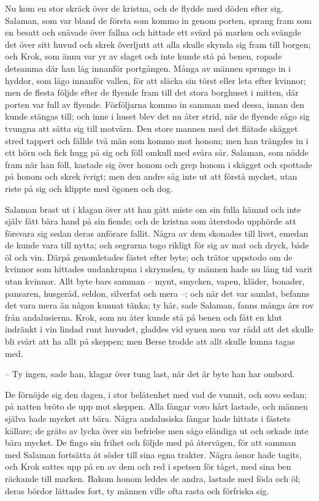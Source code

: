 \initial Nu kom en stor skräck över de kristna, och de flydde med döden efter sig. Salaman, som var bland de första som kommo in genom porten, sprang fram som en besatt och snävade över fallna och hittade ett svärd på marken och svängde det över sitt huvud och skrek överljutt att alla skulle skynda sig fram till borgen; och Krok, som ännu var yr av slaget och inte kunde stå på benen, ropade detsamma där han låg innanför portgången. Många av männen sprungo in i hyddor, som lågo innanför vallen, för att släcka sin törst eller leta efter kvinnor; men de flesta följde efter de flyende fram till det stora borghuset i mitten, där porten var full av flyende. Förföljarna kommo in samman med dessa, innan den kunde stängas till; och inne i huset blev det nu åter strid, när de flyende sågo sig tvungna att sätta sig till motvärn. Den store mannen med det flätade skägget stred tappert och fällde två män som kommo mot honom; men han trängdes in i ett hörn och fick hugg på sig och föll omkull med svåra sår. Salaman, som nådde fram när han föll, kastade sig över honom och grep honom i skägget och spottade på honom och skrek ivrigt; men den andre såg inte ut att förstå mycket, utan riste på sig och klippte med ögonen och dog.

\initial Salaman brast ut i klagan över att han gått miste om sin fulla hämnd och inte själv fått bära hand på sin fiende; och de kristna som återstodo upphörde att försvara sig sedan deras anförare fallit. Några av dem skonades till livet, emedan de kunde vara till nytta; och segrarna togo rikligt för sig av mat och dryck, både öl och vin. Därpå genomletades fästet efter byte; och trätor uppstodo om de kvinnor som hittades undankrupna i skrymslen, ty männen hade nu lång tid varit utan kvinnor. Allt byte bars samman – mynt, smycken, vapen, kläder, bonader, pansaren, husgeråd, seldon, silverfat och mera –; och när det var samlat, befanns det vara mera än någon kunnat tänka; ty här, sade Salaman, fanns många års rov från andalusierna. Krok, som nu åter kunde stå på benen och fått en klut indränkt i vin lindad runt huvudet, gladdes vid synen men var rädd att det skulle bli svårt att ha allt på skeppen; men Berse trodde att allt skulle kunna tagas med.

– Ty ingen, sade han, klagar över tung last, när det är byte han har ombord.

\initial De förnöjde sig den dagen, i stor belåtenhet med vad de vunnit, och sovo sedan; på natten bröto de upp mot skeppen. Alla fångar voro hårt lastade, och männen själva hade mycket att bära. Några andalusiska fångar hade hittats i fästets källare; de gräto av lycka över sin befrielse men sågo eländiga ut och orkade inte bära mycket. De fingo sin frihet och följde med på återvägen, för att samman med Salaman fortsätta åt söder till sina egna trakter. Några åsnor hade tagits, och Krok sattes upp på en av dem och red i spetsen för tåget, med sina ben räckande till marken. Bakom honom leddes de andra, lastade med föda och öl; deras bördor lättades fort, ty männen ville ofta rasta och förfriska sig.

